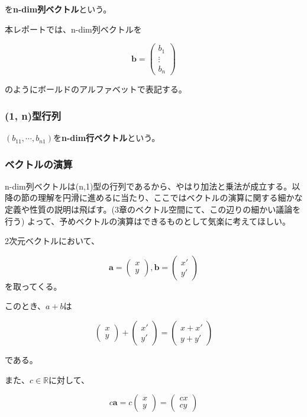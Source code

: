 \documentclass[dvipdfmx,autodetect-engine]{jsarticle}
\theoremstyle{definition}
\begin{document}
を{\bf n-dim列ベクトル}という。

本レポートでは、n-dim列ベクトルを

$$
\bm{b} = \begin{pmatrix}
b_1 \\
\vdots \\
b_n
\end{pmatrix}
$$

のようにボールドのアルファベットで表記する。

\subsubsection{(1, n)型行列}

$(b_{11}, \cdots, b_{n1})$を{\bf n-dim行ベクトル}という。

\subsubsection{ベクトルの演算}

n-dim列ベクトルは(n,1)型の行列であるから、やはり加法と乗法が成立する。以降の節の理解を円滑に進めるに当たり、ここではベクトルの演算に関する細かな定義や性質の説明は飛ばす。(3章のベクトル空間にて、この辺りの細かい議論を行う) よって、予めベクトルの演算はできるものとして気楽に考えてほしい。

2次元ベクトルにおいて、

$$
\bm{a} = \begin{pmatrix}
x \\
y
\end{pmatrix},
\bm{b} = \begin{pmatrix}
x' \\
y'
\end{pmatrix}
$$
を取ってくる。

このとき、$a + b$は

$$
\begin{pmatrix}
x \\
y
\end{pmatrix} + 
\begin{pmatrix}
x' \\
y'
\end{pmatrix}
= \begin{pmatrix}
x + x' \\
y + y'
\end{pmatrix}
$$

である。

また、$c \in \mathbb{R}$に対して、

$$
c\bm{a} =
c\begin{pmatrix}
x \\
y
\end{pmatrix}
= \begin{pmatrix}
cx \\
cy
\end{pmatrix}
$$
\end{document}
